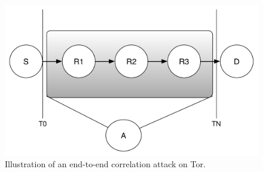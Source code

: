 \begin{figure}
\begin{center}
\includegraphics[scale=0.40]{images/tor_attack.pdf}
\caption{Illustration of an end-to-end correlation attack on Tor.}
\label{fig:tor-end-to-end}
\end{center}
\end{figure}


